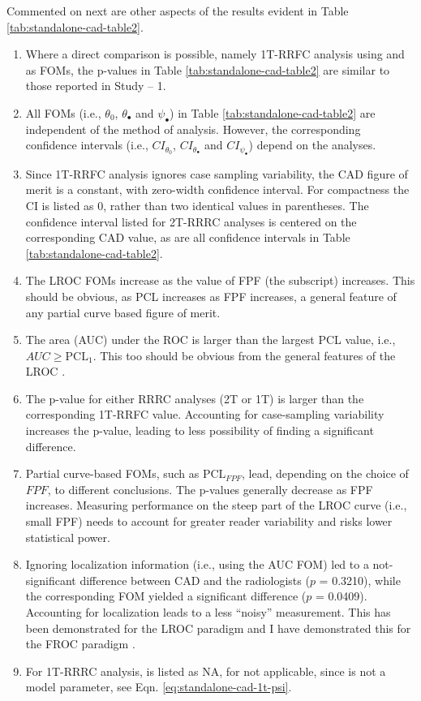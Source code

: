 \documentclass[
]{book}
\providecommand{\tightlist}{%
  \setlength{\itemsep}{0pt}\setlength{\parskip}{0pt}}
\begin{document}
Commented on next are other aspects of the results evident in Table \ref{tab:standalone-cad-table2}.

\begin{enumerate}
\def\labelenumi{\arabic{enumi}.}
\tightlist
\item
  Where a direct comparison is possible, namely 1T-RRFC analysis using and as FOMs, the p-values in Table \ref{tab:standalone-cad-table2} are similar to those reported in Study -- 1.
\item
  All FOMs (i.e., \(\theta_0\), \(\theta_{\bullet}\) and \(\psi_{\bullet}\)) in Table \ref{tab:standalone-cad-table2} are independent of the method of analysis. However, the corresponding confidence intervals (i.e., \(CI_{\theta_0}\), \(CI_{\theta_{\bullet}}\) and \(CI_{\psi_{\bullet}}\)) depend on the analyses.
\item
  Since 1T-RRFC analysis ignores case sampling variability, the CAD figure of merit is a constant, with zero-width confidence interval. For compactness the CI is listed as 0, rather than two identical values in parentheses. The confidence interval listed for 2T-RRRC analyses is centered on the corresponding CAD value, as are all confidence intervals in Table \ref{tab:standalone-cad-table2}.
\item
  The LROC FOMs increase as the value of FPF (the subscript) increases.
  This should be obvious, as PCL increases as FPF increases, a general feature of any partial curve based figure of merit.
\item
  The area (AUC) under the ROC is larger than the largest PCL value, i.e., \(AUC \geq \text{PCL}_1\). This too should be obvious from the general features of the LROC \citep{swensson1996unified}.
\item
  The p-value for either RRRC analyses (2T or 1T) is larger than the corresponding 1T-RRFC value. Accounting for case-sampling variability increases the p-value, leading to less possibility of finding a significant difference.
\item
  Partial curve-based FOMs, such as \(\text{PCL}_{FPF}\), lead, depending on the choice of \(FPF\), to different conclusions. The p-values generally decrease as FPF increases. Measuring performance on the steep part of the LROC curve (i.e., small FPF) needs to account for greater reader variability and risks lower statistical power.
\item
  Ignoring localization information (i.e., using the AUC FOM) led to a not-significant difference between CAD and the radiologists (\(p\) = 0.3210), while the corresponding FOM yielded a significant difference (\(p\) = 0.0409). Accounting for localization leads to a less ``noisy'' measurement. This has been demonstrated for the LROC paradigm \citep{swensson1996unified} and I have demonstrated this for the FROC paradigm \citep{chakraborty2008validation}.
\item
  For 1T-RRRC analysis, is listed as NA, for not applicable, since is not a model parameter, see Eqn. \eqref{eq:standalone-cad-1t-psi}.
\end{enumerate}
\end{document}
